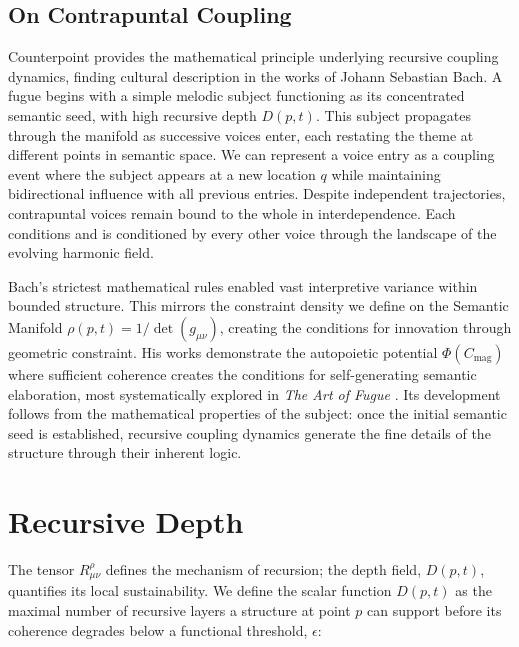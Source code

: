 
\subsection{On Contrapuntal Coupling}
\label{4.2.1:on_contrapuntal_coupling}

Counterpoint provides the mathematical principle underlying recursive coupling dynamics, finding cultural description in the works of Johann Sebastian Bach. A fugue begins with a simple melodic subject functioning as its concentrated semantic seed, with high recursive depth \(D(p,t)\). This subject propagates through the manifold as successive voices enter, each restating the theme at different points in semantic space. We can represent a voice entry as a coupling event where the subject appears at a new location \(q\) while maintaining bidirectional influence with all previous entries. Despite independent trajectories, contrapuntal voices remain bound to the whole in interdependence. Each conditions and is conditioned by every other voice through the landscape of the evolving harmonic field.

Bach's strictest mathematical rules enabled vast interpretive variance within bounded structure. This mirrors the constraint density we define on the Semantic Manifold \(\rho(p,t) = 1/\det(g_{\mu\nu})\), creating the conditions for innovation through geometric constraint. His works demonstrate the autopoietic potential \(\Phi(C_{\text{mag}})\) where sufficient coherence creates the conditions for self-generating semantic elaboration, most systematically explored in \textit{The Art of Fugue} \autocite{Bach1751}. Its development follows from the mathematical properties of the subject: once the initial semantic seed is established, recursive coupling dynamics generate the fine details of the structure through their inherent logic.


\section{Recursive Depth}
\label{4.3:recursive_depth}

The tensor \(R^\rho_{\mu\nu}\) defines the mechanism of recursion; the depth field, \(D(p, t)\), quantifies its local sustainability. We define the scalar function \(D(p,t)\) as the maximal number of recursive layers a structure at point \(p\) can support before its coherence degrades below a functional threshold, \(\epsilon\):

